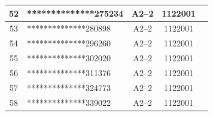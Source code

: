 \documentclass[UTF8,10pt,a4paper,fontset=fandol]{ctexart}
\newcommand{\fieldvalue}[1]{#1}
\begin{document}
\begin{center}
\begin{tabular}{|c|p{4.2cm}|c|c|p{2.0cm}|}
\fieldvalue{52} &
\fieldvalue{**************275234} &
\fieldvalue{A2--2} &
\fieldvalue{1122001} & \\ \hline
\fieldvalue{53} &
\fieldvalue{**************280898} &
\fieldvalue{A2--2} &
\fieldvalue{1122001} & \\ \hline
\fieldvalue{54} &
\fieldvalue{**************296260} &
\fieldvalue{A2--2} &
\fieldvalue{1122001} & \\ \hline
\fieldvalue{55} &
\fieldvalue{**************302020} &
\fieldvalue{A2--2} &
\fieldvalue{1122001} & \\ \hline
\fieldvalue{56} &
\fieldvalue{**************311376} &
\fieldvalue{A2--2} &
\fieldvalue{1122001} & \\ \hline
\fieldvalue{57} &
\fieldvalue{**************324773} &
\fieldvalue{A2--2} &
\fieldvalue{1122001} & \\ \hline
\fieldvalue{58} &
\fieldvalue{**************339022} &
\fieldvalue{A2--2} &
\fieldvalue{1122001} & \\ \hline

\end{tabular}
\end{center}
\end{document}
